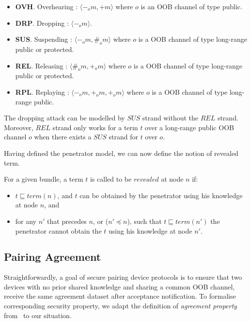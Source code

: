 \begin{itemize}
\item \textbf{OVH}. Overhearing : $\langle -_om, +m \rangle$ where $o$ is an OOB channel of type public.
\item \textbf{DRP}. Dropping : $\langle -_om \rangle$.
\item \textbf{SUS}. Suspending : $\langle -_om,\#_om \rangle$ where $o$ is a OOB channel of type long-range public or protected. 
\item \textbf{REL}. Releasing : $\langle \#_om,+_om  \rangle$ where $o$ is a OOB channel of type long-range public or protected.
\item \textbf{RPL}. Replaying : $\langle -_om,+_om,+_om  \rangle$ where $o$ is a OOB channel of type long-range public.
\end{itemize} 

The dropping attack can be modelled by $SUS$ strand without the $REL$ strand. Moreover, $REL$ strand only works for a term $t$ over a long-range public OOB channel $o$ when there exists a $SUS$ strand for $t$ over $o$.  

Having defined the penetrator model, we can now define the notion of revealed term.

\begin{Definition}
For a given bundle, a term $t$ is called to be $revealed$ at node $n$ if:
\begin{itemize}
    \item $t \sqsubseteq term(n)$, and $t$ can be obtained by the penetrator using his knowledge at node $n$, and
    \item for any $n'$ that precedes $n$, or ($n' \preceq n$), such that $t \sqsubseteq term(n')$ the penetrator cannot obtain the $t$ using his knowledge at node $n'$. 
\end{itemize} 
\end{Definition}

\subsection{Pairing Agreement}

Straightforwardly, a goal of secure pairing device protocols is to ensure that two devices with no prior shared knowledge and sharing a common OOB channel, receive the same agreement dataset after acceptance notification. To formalise corresponding security property, we adapt the definition of \textit{agreement property} from~\cite{596782} to our situation.

